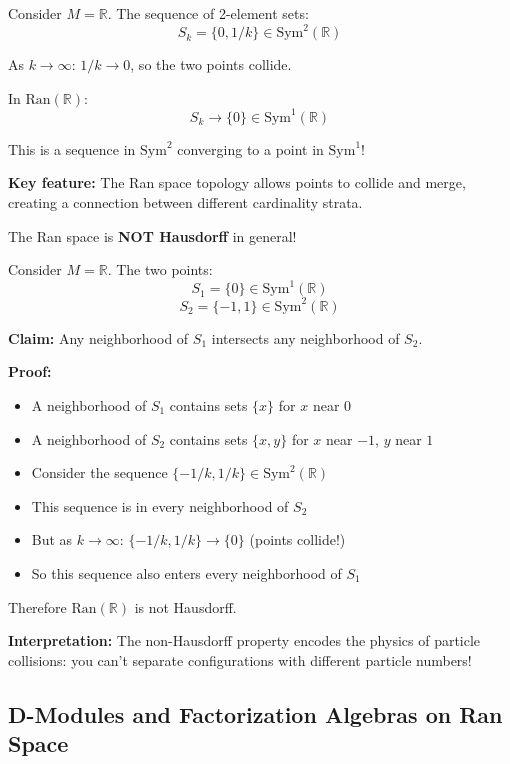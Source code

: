 \begin{example}
\label{ex:convergence-ran}
Consider $M = \mathbb{R}$. The sequence of 2-element sets:
$$S_k = \{0, 1/k\} \in \text{Sym}^2(\mathbb{R})$$

As $k \to \infty$: $1/k \to 0$, so the two points collide.

In $\text{Ran}(\mathbb{R})$:
$$S_k \to \{0\} \in \text{Sym}^1(\mathbb{R})$$

This is a sequence in $\text{Sym}^2$ converging to a point in $\text{Sym}^1$!

\textbf{Key feature:} The Ran space topology allows points to collide and merge, 
creating a connection between different cardinality strata.
\end{example}

\begin{example}
\label{ex:ran-non-hausdorff}
The Ran space is \textbf{NOT Hausdorff} in general!

Consider $M = \mathbb{R}$. The two points:
$$S_1 = \{0\} \in \text{Sym}^1(\mathbb{R})$$
$$S_2 = \{-1, 1\} \in \text{Sym}^2(\mathbb{R})$$

\textbf{Claim:} Any neighborhood of $S_1$ intersects any neighborhood of $S_2$.

\textbf{Proof:} 
\begin{itemize}
\item A neighborhood of $S_1$ contains sets $\{x\}$ for $x$ near $0$
\item A neighborhood of $S_2$ contains sets $\{x, y\}$ for $x$ near $-1$, $y$ near $1$
\item Consider the sequence $\{-1/k, 1/k\} \in \text{Sym}^2(\mathbb{R})$
\item This sequence is in every neighborhood of $S_2$
\item But as $k \to \infty$: $\{-1/k, 1/k\} \to \{0\}$ (points collide!)
\item So this sequence also enters every neighborhood of $S_1$
\end{itemize}

Therefore $\text{Ran}(\mathbb{R})$ is not Hausdorff.

\textbf{Interpretation:} The non-Hausdorff property encodes the physics of particle 
collisions: you can't separate configurations with different particle numbers!
\end{example}

\subsection{D-Modules and Factorization Algebras on Ran Space}

